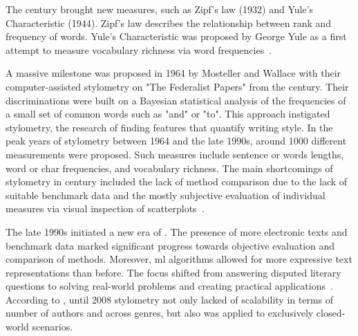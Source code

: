 
The  century brought new measures, such as Zipf's law (1932) and Yule's Characteristic (1944).
Zipf's law describes the relationship between rank and frequency of words.
Yule's Characteristic was proposed by George Yule as a first attempt to measure vocabulary richness via word frequencies~\citep{neal_surveying_2018,stamatatos_survey_2009}.

A massive milestone was proposed in 1964 by Mosteller and Wallace with their computer-assisted stylometry on "The Federalist Papers" from the  century.
Their discriminations were built on a Bayesian statistical analysis of the frequencies of a small set of common words such as "and" or "to".
This approach instigated stylometry, the research of finding features that quantify writing style.
In the peak years of stylometry between 1964 and the late 1990s, around \num{1000} different measurements were proposed.
Such measures include sentence or words lengths, word or char frequencies, and vocabulary richness.
The main shortcomings of stylometry in  century included the lack of method comparison due to the lack of suitable benchmark data and the mostly subjective evaluation of individual measures via visual inspection of scatterplots~\citep{stamatatos_survey_2009}.

The late 1990s initiated a new era of \ai{}.
The presence of more electronic texts and benchmark data marked significant progress towards objective evaluation and comparison of methods.
Moreover, \ac{ml} algorithms allowed for more expressive text representations than before. 
The focus shifted from answering disputed literary questions to solving real-world problems and creating practical applications~\citep{stamatatos_survey_2009}.
According to \citet{abbasi_writeprints_2008}, until 2008 stylometry not only lacked of scalability in terms of number of authors and across genres, but also was applied to exclusively closed-world scenarios.



